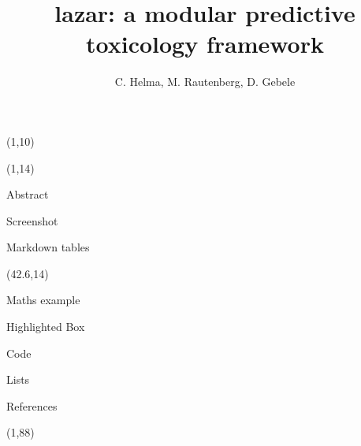 \documentclass[final]{beamer}
\title{lazar: a modular predictive toxicology framework}
\author{C. Helma, M. Rautenberg, D. Gebele}
\institute{\emph{in silico} toxicology gmbh, Basel, Switzerland}
\begin{document}
  \begin{frame}{}

    \begin{textblock}{80}(1,10)
        
    \end{textblock}

    \begin{textblock}{40.5}(1,14)
      \begin{block}{Abstract}
        
      \end{block}

      \begin{block}{Screenshot}
        
      \end{block}

      \begin{block}{Markdown tables}
        
      \end{block}

    \end{textblock}

    \begin{textblock}{40.5}(42.6,14)

      \begin{block}{Maths example}
        
      \end{block}

      \begin{alertblock}{Highlighted Box}
        
      \end{alertblock}

      \begin{block}{Code}
        
      \end{block}

      \begin{exampleblock}{Lists}
        
      \end{exampleblock}

      \begin{block}{References}
        \small
      \end{block}

    \end{textblock}

    \begin{textblock}{82.1}(1,88)
      
    \end{textblock}

  \end{frame}
\end{document}
